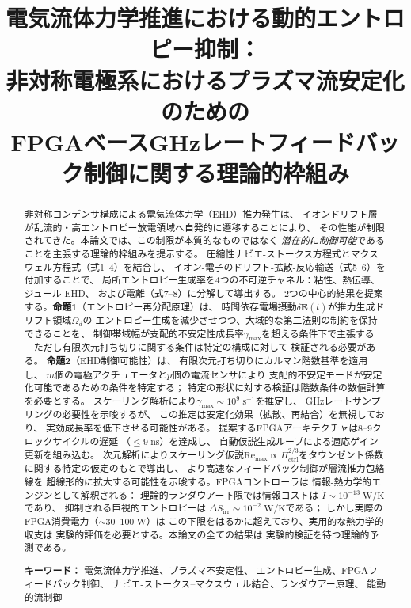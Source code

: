 \documentclass[12pt,twocolumn]{ltjsarticle}
\newcommand{\ee}{\mathbf{E}}
\newcommand{\Sdot}{\dot{S}_{\mathrm{irr}}}
\newcommand{\Pctrl}{\Pi_{\mathrm{ctrl}}}
\begin{document}
\title{
  \textbf{電気流体力学推進における動的エントロピー抑制：}\\[4pt]
  \textbf{非対称電極系におけるプラズマ流安定化のための}\\[4pt]
  \textbf{FPGAベースGHzレートフィードバック制御に関する理論的枠組み}
}

\author{
}

\date{}

\maketitle

\begin{abstract}
\noindent
非対称コンデンサ構成による電気流体力学（EHD）推力発生は、
イオンドリフト層が乱流的・高エントロピー放電領域へ自発的に遷移することにより、
その性能が制限されてきた。本論文では、この制限が本質的なものではなく
\emph{潜在的に制御可能}であることを主張する理論的枠組みを提示する。
圧縮性ナビエ-ストークス方程式とマクスウェル方程式（式1--4）を結合し、
イオン-電子のドリフト-拡散-反応輸送（式5--6）を付加することで、
局所エントロピー生成率を4つの不可逆チャネル：粘性、熱伝導、ジュール-EHD、
および電離（式7--8）に分解して導出する。
2つの中心的結果を提案する。\textbf{命題1}（エントロピー再分配原理）は、
時間依存電場摂動$\delta\ee(t)$が推力生成ドリフト領域$\Omega_d$の
エントロピー生成を減少させつつ、大域的な第二法則の制約を保持できることを、
制御帯域幅が支配的不安定性成長率$\gamma_{\max}$を超える条件下で主張する
---ただし有限次元打ち切りに関する条件は特定の構成に対して
検証される必要がある。
\textbf{命題2}（EHD制御可能性）は、
有限次元打ち切りにカルマン階数基準を適用し、
$m$個の電極アクチュエータと$p$個の電流センサにより
支配的不安定モードが安定化可能であるための条件を特定する；
特定の形状に対する検証は階数条件の数値計算を必要とする。
スケーリング解析により$\gamma_{\max} \sim
10^{9}\;\mathrm{s}^{-1}$を推定し、
GHzレートサンプリングの必要性を示唆するが、
この推定は安定化効果（拡散、再結合）を無視しており、
実効成長率を低下させる可能性がある。
提案するFPGAアーキテクチャは8--9クロックサイクルの遅延
（$\leq 9\;\mathrm{ns}$）を達成し、
自動仮説生成ループによる適応ゲイン更新を組み込む。
次元解析によりスケーリング仮説$\mathrm{Re}_{\max} \propto
\Pctrl^{2/3}$をタウンゼント係数に関する特定の仮定のもとで導出し、
より高速なフィードバック制御が層流推力包絡線を
超線形的に拡大する可能性を示唆する。FPGAコントローラは
情報-熱力学的エンジンとして解釈される：
理論的ランダウアー下限では情報コストは
$\dot{I} \sim 10^{-13}\;\mathrm{W/K}$であり、
抑制される巨視的エントロピーは
$\Delta\Sdot \sim 10^{-2}\;\mathrm{W/K}$である；
しかし実際のFPGA消費電力（$\sim 30$--$100\;\mathrm{W}$）は
この下限をはるかに超えており、実用的な熱力学的収支は
実験的評価を必要とする。本論文の全ての結果は
実験的検証を待つ理論的予測である。

\medskip
\noindent
\textbf{キーワード：} 電気流体力学推進、プラズマ不安定性、
エントロピー生成、FPGAフィードバック制御、
ナビエ-ストークス--マクスウェル結合、ランダウアー原理、
能動的流制御
\end{abstract}
\end{document}
